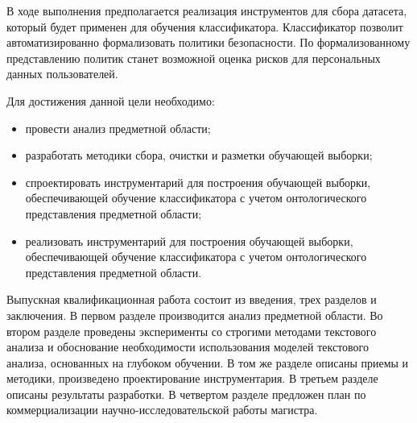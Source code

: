 \documentclass[../main]{subfiles}
\begin{document}
В ходе выполнения предполагается реализация инструментов для сбора датасета, который будет применен для обучения классификатора. Классификатор позволит автоматизированно формализовать политики безопасности. По формализованному представлению политик станет возможной оценка рисков для персональных данных пользователей.

Для достижения данной цели необходимо:

\begin{itemize}
    \item провести анализ предметной области;
    \item разработать методики сбора, очистки и разметки обучающей выборки;
    \item спроектировать инструментарий для построения обучающей выборки, обеспечивающей обучение классификатора с учетом онтологического представления предметной области;
    \item реализовать  инструментарий для построения обучающей выборки, обеспечивающей обучение классификатора с учетом онтологического представления предметной области.
\end{itemize}

Выпускная  квалификационная  работа  состоит  из  введения, трех разделов и заключения. В первом разделе производится анализ предметной области. Во втором разделе проведены эксперименты со строгими методами текстового анализа и обоснование необходимости использования моделей текстового анализа, основанных на глубоком обучении. В том же разделе описаны приемы и методики, произведено проектирование инструментария. В третьем разделе описаны результаты разработки. В четвертом разделе предложен план по коммерциализации научно-исследовательской работы магистра.
\end{document}
